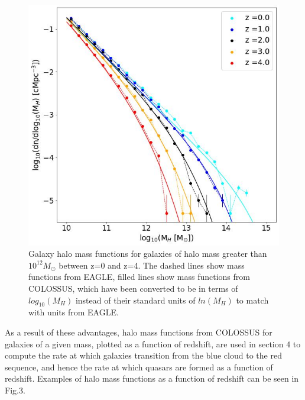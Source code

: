 \documentclass[12pt, twocolumn]{revtex4}    %
\begin{document}
\begin{figure}[H]
\centering
\includegraphics[width=\linewidth]{Mass_Function.jpeg}
\caption{Galaxy halo mass functions for galaxies of halo mass greater than $10^{12}M_\odot$ between z=0 and z=4. The dashed lines show mass functions from EAGLE, filled lines show mass functions from COLOSSUS, which have been converted to be in terms of $log_{10}(M_H)$ instead of their standard units of $ln(M_H)$ to match with units from EAGLE.}
\label{fig:2}
\end{figure}

As a result of these advantages, halo mass functions from COLOSSUS for galaxies of a given mass, plotted as a function of redshift, are used in section 4 to compute the rate at which galaxies transition from the blue cloud to the red sequence, and hence the rate at which quasars are formed as a function of redshift. Examples of halo mass functions as a function of redshift can be seen in Fig.3.
\end{document}
